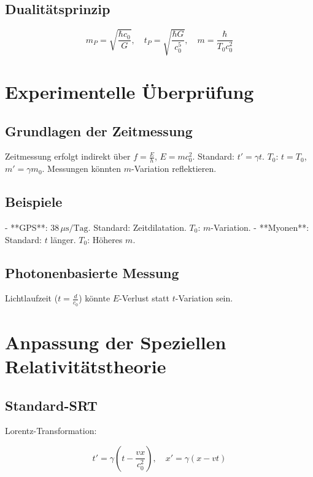 \documentclass{article}
\begin{document}
	\subsection{Dualitätsprinzip}
	
	\[
	m_P = \sqrt{\frac{\hbar c_0}{G}}, \quad t_P = \sqrt{\frac{\hbar G}{c_0^5}}, \quad m = \frac{\hbar}{T_0 c_0^2}
	\]
	
	\section{Experimentelle Überprüfung}
	
	\subsection{Grundlagen der Zeitmessung}
	
	Zeitmessung erfolgt indirekt über \( f = \frac{E}{h} \), \( E = m c_0^2 \). Standard: \( t' = \gamma t \). \( T_0 \): \( t = T_0 \), \( m' = \gamma m_0 \). Messungen könnten \( m \)-Variation reflektieren.
	
	\subsection{Beispiele}
	
	- **GPS**: \( 38 \, \mu\text{s/Tag} \). Standard: Zeitdilatation. \( T_0 \): \( m \)-Variation.
	- **Myonen**: Standard: \( t \) länger. \( T_0 \): Höheres \( m \).
	
	\subsection{Photonenbasierte Messung}
	
	Lichtlaufzeit (\( t = \frac{d}{c_0} \)) könnte \( E \)-Verlust statt \( t \)-Variation sein.
	
	\section{Anpassung der Speziellen Relativitätstheorie}
	
	\subsection{Standard-SRT}
	
	Lorentz-Transformation:
	
	\[
	t' = \gamma \left( t - \frac{v x}{c_0^2} \right), \quad x' = \gamma (x - v t)
	\]
	
\end{document}
